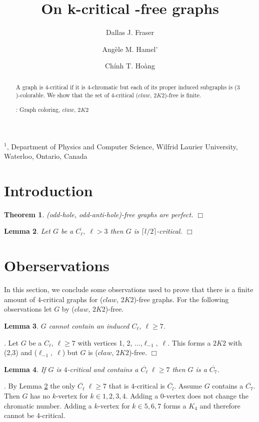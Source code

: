 \documentclass[12pt]{article}
\title{On k-critical {\CK}-free graphs}
\author{
	Dallas J. Fraser\inst{1}
	\and Ang\`ele M. Hamel'\inst{1}
	\and Ch\'inh T. Ho\`ang\inst{1}
}
\newtheorem{Theorem}{Theorem}[section]
\newtheorem{Lemma}[Theorem]{Lemma}
\def\inst#1{$^{#1}$}
\def\CK{($claw$, $2K2$)}
\begin{document}
\maketitle

\begin{center}
{\footnotesize

\inst{1}, Department of Physics and Computer Science, Wilfrid Laurier
University, \\Waterloo, Ontario, Canada}

\end{center}

\begin{abstract}
A graph is $4$-critical if it is $4$-chromatic but each of its proper induced subgraphs is ($3$)-colorable. We show that the set of $4$-critical {\CK}-free is finite.

: Graph coloring, $claw$, $2K2$
\end{abstract}


\section{Introduction}\label{sec:intro}

\begin{Theorem}\label{thm:strong-perfect}
(odd-hole, odd-anti-hole)-free graphs are perfect. $\Box$
\end{Theorem}

\begin{Lemma}\label{lem:anti-hole-critical}
Let $G$ be a $\overline{C_\ell,}\; \ell >3$ then $G$ is $\lceil l/2 \rceil$-critical. $\Box$
\end{Lemma}

\section{Oberservations}\label{sec:observations}
In this section, we conclude some observations used to prove that there is a finite amount of $4$-critical graphs for {\CK}-free graphs. For the following observations let $G$ by {\CK}-free.
\begin{Lemma}\label{lem:odd-hole-free}
$G$ cannot contain an induced $C_\ell$, $\ell \geq 7$.
\end{Lemma}
. Let $G$ be a $C_\ell$, $\ell \geq 7$ with vertices 1, 2, ...,$\ell_{-1},\; \ell$. This forms a $2K2$ with (2,3) and ($\ell_{-1},\; \ell$) but $G$ is {\CK}-free. $\Box$

\begin{Lemma}\label{lem:odd-anti-hole}
If $G$ is $4$-critical and contains a $\overline{C_\ell}\; \ell \geq 7$ then $G$ is a $\overline{C_7}$.
\end{Lemma}
. 
By Lemma \ref{lem:anti-hole-critical} the only $\overline{C_\ell}\; \ell \geq 7$ that is $4$-critical is $\overline{C_l}$. Assume $G$ contains a $\overline{C_7}$. Then $G$ has no $k$-vertex for $k \in {1, 2, 3, 4}$. Adding a $0$-vertex does not change the chromatic number. Adding a $k$-vertex for $k \in {5, 6, 7}$ forms a  $K_4$ and therefore cannot be $4$-critical.
\end{document}
